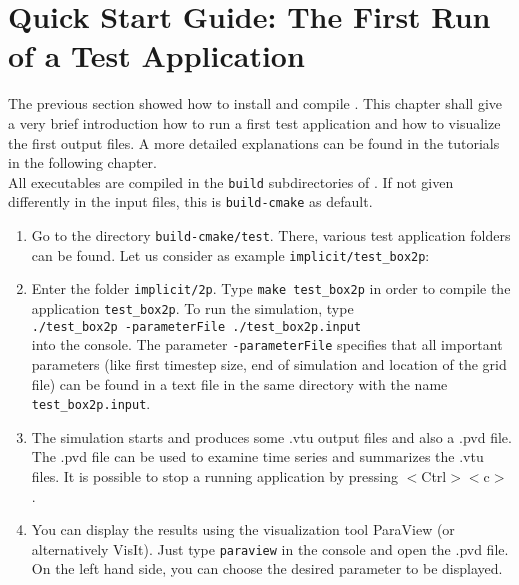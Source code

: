 \section[Quick Start Guide]{Quick Start Guide: The First Run of a Test Application}
\label{quick-start-guide}

The previous section showed how to install and compile \Dumux. This chapter
shall give a very brief introduction how to run a first test application and how
to visualize the first output files. A more detailed explanations can be found in
the tutorials in the following chapter.\\
All executables are compiled in the \texttt{build} subdirectories of \Dumux.
If not given differently in the input files, this is \texttt{build-cmake} as default.

\begin{enumerate}
\item Go to the directory \texttt{build-cmake/test}. There, various test application
      folders can be found. Let us consider as example \texttt{implicit/test{\_}box2p}:
\item Enter the folder \texttt{implicit/2p}. Type \texttt{make test{\_}box2p} in order
      to compile the application \texttt{test{\_}box2p}. To run the simulation, type\\
      \texttt{./test{\_}box2p -parameterFile ./test\_box2p.input}\\
      into the console. The parameter \texttt{-parameterFile} specifies that all
      important parameters (like first timestep size, end of simulation and location
      of the grid file) can be found in a text file in the same directory  with the
      name \texttt{test\_box2p.input}.
\item The simulation starts and produces some .vtu output files and also a .pvd
      file. The .pvd file can be used to examine time series and summarizes the .vtu
      files. It is possible to stop a running application by pressing $<$Ctrl$><$c$>$.
\item You can display the results using the visualization tool ParaView (or
      alternatively VisIt). Just type \texttt{paraview} in the console and open the
      .pvd file. On the left hand side, you can choose the desired parameter to be displayed.
\end{enumerate}
